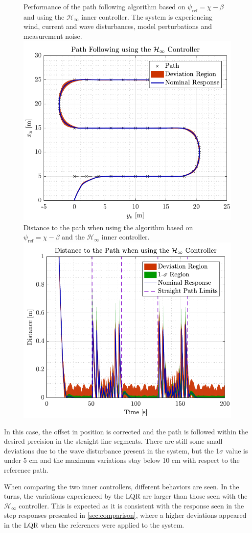 \begin{figure}[H]
	\captionbox 
	{   
		Performance of the path following algorithm based on $\psi_\mathrm{ref}=\chi-\beta$ and using the $\mathcal{H}_\infty$ inner controller. The system is experiencing wind, current and wave disturbances, model perturbations and measurement noise. \label{fig:robustcorrect}
	}                                                                 
	{                                                                  
		\includegraphics[width=.45\textwidth]{figures/path_rob}         
	}                                                                    
	\hspace{5pt}                                                          
	\captionbox  
	{      
			Distance to the path when using the algorithm based on $\psi_\mathrm{ref}=\chi-\beta$ and the $\mathcal{H}_\infty$ inner controller. \label{fig:distrobustcorrect}
	}                                                                          
	{
		\includegraphics[width=.45\textwidth]{figures/dist_rob}
	}
\end{figure}

In this case, the offset in position is corrected and the path is followed within the desired precision in the straight line segments. There are still some small deviations due to the wave disturbance present in the system, but the 1$\sigma$ value is under 5 cm and the maximum variations stay below 10 cm with respect to the reference path.

When comparing the two inner controllers, different behaviors are seen. In the turns, the variations experienced by the LQR are larger than those seen with the $\mathcal{H}_\infty$ controller. This is expected as it is consistent with the response seen in the step responses presented in \autoref{sec:comparison}, where a higher deviations appeared in the LQR when the references were applied to the system. 


